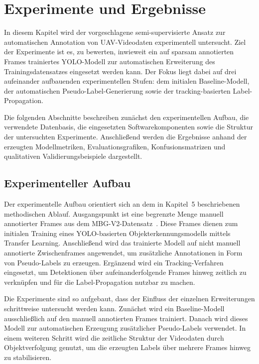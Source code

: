
\section{Experimente und Ergebnisse}
\label{sec:experiments}

In diesem Kapitel wird der vorgeschlagene semi-supervisierte Ansatz zur automatischen Annotation von UAV-Videodaten experimentell untersucht. Ziel der Experimente ist es, zu bewerten, inwieweit ein auf sparsam annotierten Frames trainiertes YOLO-Modell zur automatischen Erweiterung des Trainingsdatensatzes eingesetzt werden kann. Der Fokus liegt dabei auf drei aufeinander aufbauenden experimentellen Stufen: dem initialen Baseline-Modell, der automatischen Pseudo-Label-Generierung sowie der tracking-basierten Label-Propagation.

Die folgenden Abschnitte beschreiben zunächst den experimentellen Aufbau, die verwendete Datenbasis, die eingesetzten Softwarekomponenten sowie die Struktur der untersuchten Experimente. Anschließend werden die Ergebnisse anhand der erzeugten Modellmetriken, Evaluationsgrafiken, Konfusionsmatrizen und qualitativen Validierungsbeispiele dargestellt.

\subsection{Experimenteller Aufbau}

Der experimentelle Aufbau orientiert sich an dem in Kapitel~5 beschriebenen methodischen Ablauf. Ausgangspunkt ist eine begrenzte Menge manuell annotierter Frames aus dem MBG-V2-Datensatz~\cite{passos2024mbgv2}. Diese Frames dienen zum initialen Training eines YOLO-basierten Objekterkennungsmodells mittels Transfer Learning. Anschließend wird das trainierte Modell auf nicht manuell annotierte Zwischenframes angewendet, um zusätzliche Annotationen in Form von Pseudo-Labels zu erzeugen. Ergänzend wird ein Tracking-Verfahren eingesetzt, um Detektionen über aufeinanderfolgende Frames hinweg zeitlich zu verknüpfen und für die Label-Propagation nutzbar zu machen.

Die Experimente sind so aufgebaut, dass der Einfluss der einzelnen Erweiterungen schrittweise untersucht werden kann. Zunächst wird ein Baseline-Modell ausschließlich auf den manuell annotierten Frames trainiert. Danach wird dieses Modell zur automatischen Erzeugung zusätzlicher Pseudo-Labels verwendet. In einem weiteren Schritt wird die zeitliche Struktur der Videodaten durch Objektverfolgung genutzt, um die erzeugten Labels über mehrere Frames hinweg zu stabilisieren.

